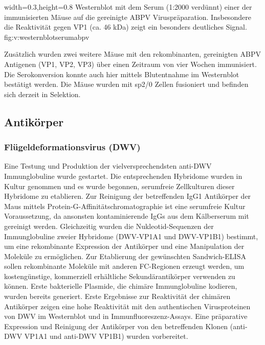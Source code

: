 {width=0.3\textwidth,height=0.8\textheight}
{Westernblot mit dem Serum (1:2000 verdünnt) einer der immunisierten Mäuse auf die gereinigte ABPV Viruspräparation. Insbesondere die Reaktivität gegen VP1 (ca. 46 kDa) zeigt ein besonders deutliches Signal.}%
{}%
{fig:v:westernblotserumabpv}%

Zusätzlich wurden zwei weitere Mäuse mit den rekombinanten, gereinigten ABPV Antigenen (VP1, VP2, VP3) über einen Zeitraum von vier Wochen immunisiert. Die Serokonversion konnte auch hier mittels Blutentnahme im Westernblot bestätigt werden. Die Mäuse wurden mit sp2/0 Zellen fusioniert und befinden sich derzeit in Selektion.


\subsection{Antikörper}
\subsubsection{Flügeldeformationsvirus (DWV)}
Eine Testung und Produktion der vielversprechendsten anti-DWV Immunglobuline wurde gestartet. Die entsprechenden Hybridome wurden in Kultur genommen und es wurde begonnen, serumfreie Zellkulturen dieser Hybridome zu etablieren. Zur Reinigung der betreffenden IgG1 Antikörper der Maus mittels Protein-G-Affinitätschromatographie ist eine serumfreie Kultur Voraussetzung, da ansonsten kontaminierende IgGs aus dem Kälberserum mit gereinigt werden. Gleichzeitig wurden die Nukleotid-Sequenzen der Immunglobuline zweier Hybridome (DWV-VP1A1 und DWV-VP1B1) bestimmt, um eine rekombinante Expression der Antikörper und eine Manipulation der Moleküle zu ermöglichen. Zur Etablierung der gewünschten Sandwich-ELISA sollen rekombinante Moleküle mit anderen FC-Regionen erzeugt werden, um kostengünstige, kommerziell erhältliche Sekundärantikörper verwenden zu können. Erste bakterielle Plasmide, die chimäre Immunglobuline kodieren, wurden bereits generiert. Erste Ergebnisse zur Reaktivität der chimären Antikörper zeigen eine hohe Reaktivität mit den authentischen Virusproteinen von DWV im Westernblot und in Immunfluoreszenz-Assays. Eine präparative Expression und Reinigung der Antikörper von den betreffenden Klonen (anti-DWV VP1A1 und anti-DWV VP1B1) wurden vorbereitet.

